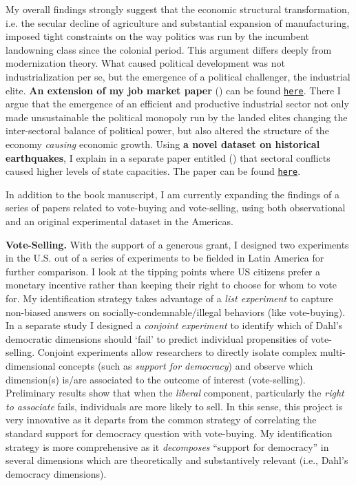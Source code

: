 \documentclass[10pt,stdletter,dateno,sigleft]{newlfm} %
\begin{document}
\begin{newlfm}
My overall findings strongly suggest that the economic structural transformation, i.e. the secular decline of agriculture and substantial expansion of manufacturing, imposed tight constraints on the way politics was run by the incumbent landowning class since the colonial period. This argument differs deeply from modernization theory. What caused political development was not industrialization per se, but the emergence of a political challenger, the industrial elite. {\bf An extension of my job market paper} (\emph{\unskip}) can be found \href{https://github.com/hbahamonde/Negative_Link_Paper/raw/master/Bahamonde_NegativeLink.pdf}{\texttt{here}}. There I argue that the emergence of an efficient and productive industrial sector not only made unsustainable the political monopoly run by the landed elites changing the inter-sectoral balance of political power, but also altered the structure of the economy \emph{causing} economic growth. Using {\bf a novel dataset on historical earthquakes}, I explain in a separate paper entitled \emph{} \unskip (\emph{\unskip}\unskip) that sectoral conflicts caused higher levels of state capacities. The paper can be found \href{https://github.com/hbahamonde/Earthquake_Paper/raw/master/Bahamonde_Earthquake_Paper.pdf}{\texttt{here}}.


In addition to the book manuscript, I am currently expanding the findings of a series of papers related to vote-buying and vote-selling, using both observational and an original experimental dataset in the Americas. 

{\bf Vote-Selling.} With the support of a generous grant, I designed two experiments in the U.S. out of a series of experiments to be fielded in Latin America for further comparison. I look at the tipping points where US citizens prefer a monetary incentive rather than keeping their right to choose for whom to vote for. My identification strategy takes advantage of a \emph{list experiment} to capture non-biased answers on socially-condemnable/illegal behaviors (like vote-buying). In a separate study I designed a \emph{conjoint experiment} to identify which of Dahl's democratic dimensions should `fail' to predict individual propensities of vote-selling. Conjoint experiments allow researchers to directly isolate complex multi-dimensional concepts (such as \emph{support for democracy}) and observe which dimension(s) is/are associated to the outcome of interest (vote-selling). Preliminary results show that when the \emph{liberal} component, particularly the \emph{right to associate} fails, individuals are more likely to sell. In this sense, this project is very innovative as it departs from the common strategy of correlating the standard support for democracy question with vote-buying. My identification strategy is more comprehensive as it \emph{decomposes} ``support for democracy'' in several dimensions which are theoretically and substantively relevant (i.e., Dahl's democracy dimensions). 


\end{newlfm}
\end{document}
